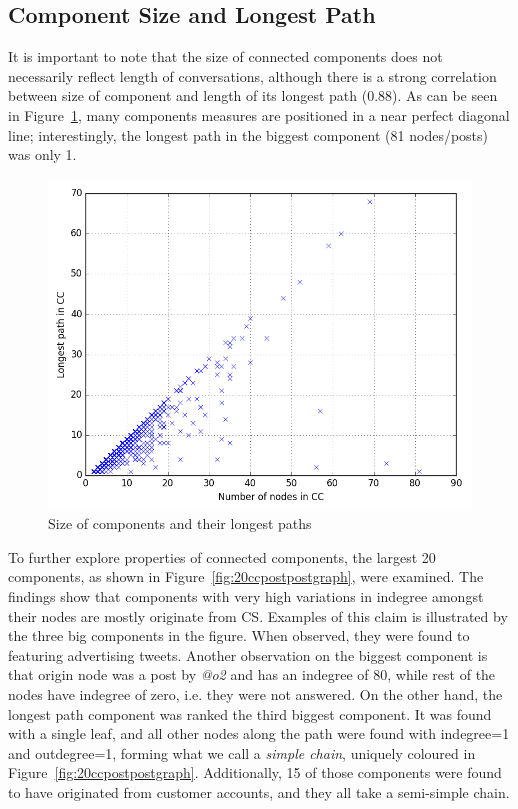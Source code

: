 \documentclass[sigconf]{acmart}
\begin{document}

\subsection{Component Size and Longest Path}

It is important to note that the size of connected components does not
necessarily reflect length of conversations, although there is a
strong correlation between size of component and length of its longest
path (0.88). As can be seen in Figure~\ref{fig:ccsizepaths}, many
components measures are positioned in a near perfect diagonal line;
interestingly, the longest path in the biggest component (81
nodes/posts) was only 1.

\begin{figure}[htb]
\centering
\includegraphics[width=\columnwidth]{images/ccsizepaths.png}
\caption{Size of components and their longest paths}
\label{fig:ccsizepaths}
\end{figure}

To further explore properties of connected components, the largest 20
components, as shown in Figure~\ref{fig:20ccpostpostgraph}, were
examined.  The findings show that components with very high variations
in indegree amongst their nodes are mostly originate from CS. Examples
of this claim is illustrated by the three big components in the
figure. When observed, they were found to featuring advertising
tweets. Another observation on the biggest component is that origin
node was a post by {\emph{@o2}} and has an indegree of 80, while rest
of the nodes have indegree of zero, i.e. they were not answered. On
the other hand, the longest path component was ranked the third
biggest component. It was found with a single leaf, and all other
nodes along the path were found with indegree=1 and outdegree=1,
forming what we call a {\emph{simple chain}}, uniquely coloured in
Figure~\ref{fig:20ccpostpostgraph}. Additionally, 15 of those
components were found to have originated from customer accounts, and
they all take a semi-simple chain.
\end{document}
